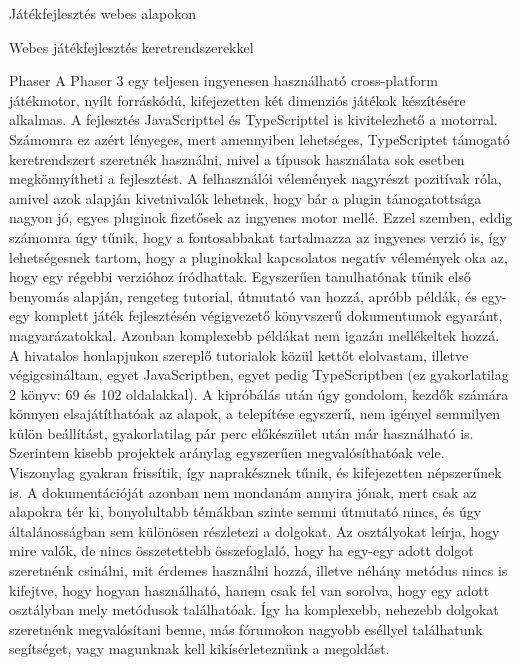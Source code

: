 \begin{MyChapter}{Játékfejlesztés webes alapokon}
\begin{MySection}{Webes játékfejlesztés keretrendszerekkel}
		\begin{MySubSection}{Phaser}
			A Phaser 3 egy teljesen ingyenesen használható cross-platform játékmotor, nyílt forráskódú, kifejezetten két dimenziós játékok készítésére alkalmas. A fejlesztés JavaScripttel és TypeScripttel is kivitelezhető a motorral. Számomra ez azért lényeges, mert amennyiben lehetséges, TypeScriptet támogató keretrendszert szeretnék használni, mivel a típusok használata sok esetben megkönnyítheti a fejlesztést.
			A felhasználói vélemények nagyrészt pozitívak róla, amivel azok alapján kivetnivalók lehetnek, hogy bár a plugin támogatottsága nagyon jó, egyes pluginok fizetősek az ingyenes motor mellé. Ezzel szemben, eddig számomra úgy tűnik, hogy a fontosabbakat tartalmazza az ingyenes verzió is, így lehetségesnek tartom, hogy a pluginokkal kapcsolatos negatív vélemények oka az, hogy egy régebbi verzióhoz íródhattak.
			Egyszerűen tanulhatónak tűnik első benyomás alapján, rengeteg tutorial, útmutató van hozzá, apróbb példák, és egy-egy komplett játék fejlesztésén végigvezető könyvszerű dokumentumok egyaránt, magyarázatokkal. Azonban komplexebb példákat nem igazán mellékeltek hozzá.
			A hivatalos honlapjukon szereplő tutorialok közül kettőt elolvastam, illetve végigcsináltam, egyet JavaScriptben, egyet pedig TypeScriptben (ez gyakorlatilag 2 könyv: 69 és 102 oldalakkal). \cite{infinite_jumper} \cite{infinite_runner}
			A kipróbálás után úgy gondolom, kezdők számára könnyen elsajátíthatóak az alapok, a telepítése egyszerű, nem igényel semmilyen külön beállítást, gyakorlatilag pár perc előkészület után már használható is.
			Szerintem kisebb projektek aránylag egyszerűen megvalósíthatóak vele.
			Viszonylag gyakran frissítik, így naprakésznek tűnik, és kifejezetten népszerűnek is.
			A dokumentációját azonban nem mondanám annyira jónak, mert csak az alapokra tér ki, bonyolultabb témákban szinte semmi útmutató nincs, és úgy általánosságban sem különösen részletezi a dolgokat. Az osztályokat leírja, hogy mire valók, de nincs összetettebb összefoglaló, hogy ha egy-egy adott dolgot szeretnénk csinálni, mit érdemes használni hozzá, illetve néhány metódus nincs is kifejtve, hogy hogyan használható, hanem csak fel van sorolva, hogy egy adott osztályban mely metódusok találhatóak. Így ha komplexebb, nehezebb dolgokat szeretnénk megvalósítani benne, más fórumokon nagyobb eséllyel találhatunk segítséget, vagy magunknak kell kikísérleteznünk a megoldást.
			

\end{MySubSection}
\end{MySection}
\end{MyChapter}
